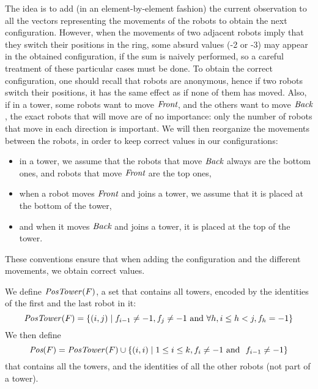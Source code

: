 \medskip
The idea is to add (in an element-by-element fashion) the current observation
to all the vectors representing the movements of the robots to obtain the next 
configuration. However, when the movements of two adjacent robots imply 
that they switch their positions in the ring, some absurd values (-2 or -3) 
may appear in the obtained configuration, if the sum is naively performed, 
so a careful treatment of these particular cases must be done. To obtain 
the correct configuration, one should recall that robots are anonymous, 
hence if two robots switch their positions, it has the same effect as if none 
of them has moved. Also, if in a tower, some robots want to move $\textit{Front}$, 
and the others want to move $\textit{Back}$, the exact robots that will move 
are of no importance:  only the number of robots that move in each direction is important. 
We will then reorganize the movements between the robots, in order
 to keep correct values in our configurations:  
 \begin{itemize}
 \item in a tower, we assume that the robots that move $\textit{Back}$
	 always are the bottom ones, and robots that move $\textit{Front}$ are the 
	 top ones, 
\item when a robot moves $\textit{Front}$ and joins a tower, we assume that 
	 it is placed at the bottom of the tower,  
\item and when it moves $\textit{Back}$ and joins a tower, it is 
 placed at the top of the tower. 
 \end{itemize}
 These conventions ensure that when adding the configuration  and the different
 movements, we obtain correct values.
  
 We define $\mathit{PosTower}(F)$, a set that contains all towers, encoded by the identities of the first and the last robot in it:  
 $$\mathit{PosTower}(F)=\{(i, j)\mid f_{i-1} \neq -1, f_j\neq -1\textrm{ and }\forall h, i\leq h< j, f_h=-1\}$$
 We then define
$$\textit{Pos}(F)=\mathit{PosTower}(F) 
 \cup\{(i, i)\mid 1\leq i\leq k, f_i \neq -1 \textrm{ and } \ f_{i-1} \neq -1 \}$$ 
 that contains all the towers, and the identities of all the other robots (not part of a tower).
 

